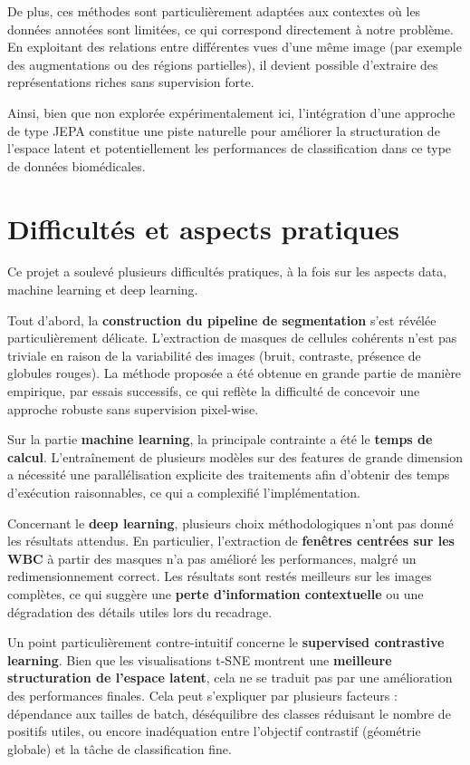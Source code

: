 \documentclass[journal,twocolumn]{IEEEtran}
\begin{document}
De plus, ces méthodes sont particulièrement adaptées aux contextes où les données annotées sont limitées, ce qui correspond directement à notre problème. En exploitant des relations entre différentes vues d’une même image (par exemple des augmentations ou des régions partielles), il devient possible d’extraire des représentations riches sans supervision forte.

Ainsi, bien que non explorée expérimentalement ici, l’intégration d’une approche de type JEPA constitue une piste naturelle pour améliorer la structuration de l’espace latent et potentiellement les performances de classification dans ce type de données biomédicales.




\section{Difficultés et aspects pratiques}

Ce projet a soulevé plusieurs difficultés pratiques, à la fois sur les aspects data, machine learning et deep learning.

Tout d’abord, la \textbf{construction du pipeline de segmentation} s’est révélée particulièrement délicate. L’extraction de masques de cellules cohérents n’est pas triviale en raison de la variabilité des images (bruit, contraste, présence de globules rouges). La méthode proposée a été obtenue en grande partie de manière empirique, par essais successifs, ce qui reflète la difficulté de concevoir une approche robuste sans supervision pixel-wise.

Sur la partie \textbf{machine learning}, la principale contrainte a été le \textbf{temps de calcul}. L’entraînement de plusieurs modèles sur des features de grande dimension a nécessité une parallélisation explicite des traitements afin d’obtenir des temps d’exécution raisonnables, ce qui a complexifié l’implémentation.

Concernant le \textbf{deep learning}, plusieurs choix méthodologiques n’ont pas donné les résultats attendus. En particulier, l’extraction de \textbf{fenêtres centrées sur les WBC} à partir des masques n’a pas amélioré les performances, malgré un redimensionnement correct. Les résultats sont restés meilleurs sur les images complètes, ce qui suggère une \textbf{perte d’information contextuelle} ou une dégradation des détails utiles lors du recadrage.

Un point particulièrement contre-intuitif concerne le \textbf{supervised contrastive learning}. Bien que les visualisations t-SNE montrent une \textbf{meilleure structuration de l’espace latent}, cela ne se traduit pas par une amélioration des performances finales. Cela peut s’expliquer par plusieurs facteurs : dépendance aux tailles de batch, déséquilibre des classes réduisant le nombre de positifs utiles, ou encore inadéquation entre l’objectif contrastif (géométrie globale) et la tâche de classification fine.
\end{document}
